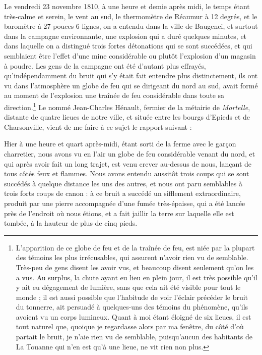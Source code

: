 \documentclass[a4paper, 12pt, oneside, french]{article}
\begin{document}
\og Le vendredi 23 novembre 1810, à une heure et demie après midi, le temps étant très-calme et serein, le vent au sud, le thermomètre de Réaumur à 12 degrés, et le baromètre à 27 pouces 6 lignes, on a entendu dans la ville de Baugenci, et surtout dans la campagne environnante, une explosion qui a duré quelques minutes, et dans laquelle on a distingué trois fortes détonations qui se sont succédées, et qui semblaient être l'effet d'une mine considérable ou plutôt l'explosion d'un magasin à poudre. Les gens de la campagne ont été d'autant plus effrayés, qu'indépendamment du bruit qui s'y était fait entendre plus distinctement, ils ont vu dans l'atmosphère un globe de feu qui se dirigeant du nord au sud, avait formé au moment de l'explosion une traînée de feu considérable dans toute sa direction.\footnote{L'apparition de ce globe de feu et de la traînée de feu, est niée par la plupart des témoins les plus irrécusables, qui assurent n'avoir rien vu de semblable. Très-peu de gens disent les avoir vus, et beaucoup disent seulement qu'on les a vus. Au surplus, la chute ayant eu lieu en plein jour, il est très possible qu'il y ait eu dégagement de lumière, sans que cela ait été visible pour tout le monde ; il est aussi possible que l'habitude de voir l'éclair précéder le bruit du tonnerre, ait persuadé à quelques-uns des témoins du phénomène, qu'ils avoient vu un corps lumineux. Quant à moi étant éloigné de six lieues, il est tout naturel que, quoique je regardasse alors par ma fenêtre, du côté d'où partait le bruit, je n'aie rien vu de semblable, puisqu’aucun des habitants de La Touanne qui n'en est qu'à une lieue, ne vit rien non plus.} Le nommé Jean-Charles Hénault, fermier de la métairie de \emph{Mortelle}, distante de quatre lieues de notre ville, et située entre les bourgs d'Epieds et de Charsonville, vient de me faire à ce sujet le rapport suivant : \fg

\og Hier à une heure et quart après-midi, étant sorti de la ferme avec le garçon charretier, nous avons vu en l'air un globe de feu considérable venant du nord, et qui après avoir fait un long trajet, est venu crever au-dessus de nous, lançant de tous côtés feux et flammes. Nous avons entendu aussitôt trois coups qui se sont succédés à quelque distance les uns des autres, et nous ont paru semblables à trois forts coups de canon : à ce bruit a succédé un sifflement extraordinaire, produit par une pierre accompagnée d'une fumée très-épaisse, qui a été lancée près de l'endroit où nous étions, et a fait jaillir la terre sur laquelle elle est tombée, à la hauteur de plus de cinq pieds. \fg
\end{document}
